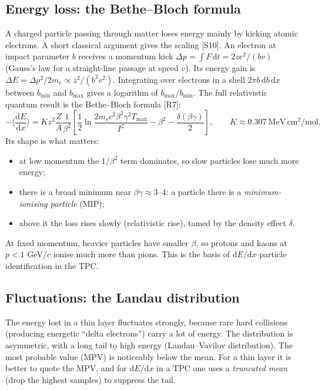 \documentclass[11pt,letterpaper]{article}
\begin{document}
\subsection{Energy loss: the Bethe--Bloch formula}
A charged particle passing through matter loses energy mainly by kicking atomic electrons.
A short classical argument gives the scaling [S10].
An electron at impact parameter $b$ receives a momentum kick $\Delta p=\int F\,\mathrm{d}t=2ze^2/(bv)$ (Gauss's law for a straight-line passage at speed $v$).
Its energy gain is $\Delta E=\Delta p^2/2m_e\propto z^2/(b^2v^2)$.
Integrating over electrons in a shell $2\pi b\,\mathrm{d}b\,\mathrm{d}x$ between $b_{\min}$ and $b_{\max}$ gives a logarithm of $b_{\max}/b_{\min}$.
The full relativistic quantum result is the Bethe--Bloch formula [R7]:
\begin{equation}
-\Big\langle\frac{\mathrm{d}E}{\mathrm{d}x}\Big\rangle=K z^2\frac{Z}{A}\frac{1}{\beta^2}\left[\frac12\ln\frac{2m_ec^2\beta^2\gamma^2T_{\max}}{I^2}-\beta^2-\frac{\delta(\beta\gamma)}{2}\right],\qquad K\approx0.307\ \mathrm{MeV\,cm^2/mol}.
\end{equation}
Its shape is what matters:
\begin{itemize}
\item at low momentum the $1/\beta^2$ term dominates, so slow particles lose much more energy;
\item there is a broad minimum near $\beta\gamma\approx3$--4: a particle there is a \emph{minimum-ionising particle} (MIP);
\item above it the loss rises slowly (relativistic rise), tamed by the density effect $\delta$.
\end{itemize}
At fixed momentum, heavier particles have smaller $\beta$, so protons and kaons at $p<1$ GeV/$c$ ionise much more than pions. This is the basis of $\mathrm{d}E/\mathrm{d}x$ particle identification in the TPC.

\subsection{Fluctuations: the Landau distribution}
The energy lost in a thin layer fluctuates strongly, because rare hard collisions (producing energetic ``delta electrons'') carry a lot of energy.
The distribution is asymmetric, with a long tail to high energy (Landau--Vavilov distribution).
The most probable value (MPV) is noticeably below the mean.
For a thin layer it is better to quote the MPV, and for $\mathrm{d}E/\mathrm{d}x$ in a TPC one uses a \emph{truncated mean} (drop the highest samples) to suppress the tail.
\end{document}
